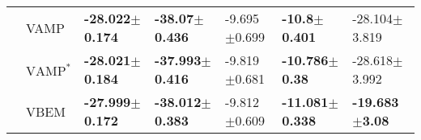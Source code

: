 \begin{tabular}{lllllll}
             & VAMP &  \textbf{-28.022$\pm$0.174} &   \textbf{-38.07$\pm$0.436} &           -9.695$\pm$0.699 &    \textbf{-10.8$\pm$0.401} &          -28.104$\pm$3.819 \\
             & $\text{VAMP}^*$ &  \textbf{-28.021$\pm$0.184} &  \textbf{-37.993$\pm$0.416} &           -9.819$\pm$0.681 &   \textbf{-10.786$\pm$0.38} &          -28.618$\pm$3.992 \\
             & VBEM &  \textbf{-27.999$\pm$0.172} &  \textbf{-38.012$\pm$0.383} &           -9.812$\pm$0.609 &  \textbf{-11.081$\pm$0.338} &  \textbf{-19.683$\pm$3.08} \\
\bottomrule
\end{tabular}

